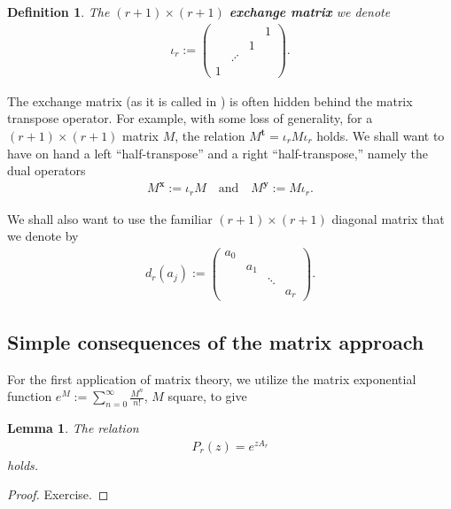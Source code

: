 \documentclass[11pt]{article}
\newtheorem{defin}{Definition}
\newtheorem{lem}{Lemma}
\begin{document}
    \begin{defin}
        The $(r+1) \times (r+1) $ \textbf{exchange matrix} we denote 
            \begin{eqnarray*}
                \iota_r := 
                    \begin{pmatrix}
                        &&&1\\
                        &&1\\
                        & \iddots \\
                        1
                    \end{pmatrix}.
            \end{eqnarray*}
    \end{defin}

The exchange matrix (as it is called in \cite{hornJohnson1985}) is often hidden behind the matrix transpose operator. For example, with some loss of generality, for a $ (r+1) \times (r+1) $ matrix $ M $, the relation $ M^\mathbf{t} = \iota_r M \iota_r  $ holds. We shall want to have on hand a left ``half-transpose'' and a right ``half-transpose,'' namely the dual operators
    \begin{eqnarray}\label{eq:halfTranspose}
        M^\mathbf{x} := \iota_r M \quad \text{and} \quad
        M^\mathbf{y} := M\iota_r.
    \end{eqnarray}


We shall also want to use the familiar $(r+1) \times (r+1)$ diagonal matrix that we denote by
    \begin{eqnarray}\label{eq:diagMatrix}
        d_r(a_j) :=
            \begin{pmatrix}
                a_0\\
                & a_1 \\
                &&\ddots \\
                &&& a_r
            \end{pmatrix}.
    \end{eqnarray}

\subsection{Simple consequences of the matrix approach}
For the first application of matrix theory, we utilize the matrix exponential function $ e^M := \sum_{n=0}^{\infty}\frac{M^n}{n!} $, $M$ square, to give
   \begin{lem}\label{lem:pascalExp}
        The relation
            \begin{eqnarray*}
                P_r(z) = e^{z A_r} 
            \end{eqnarray*}
        holds. 
    \end{lem}
    \begin{proof}
        Exercise.
    \end{proof}
\end{document}
